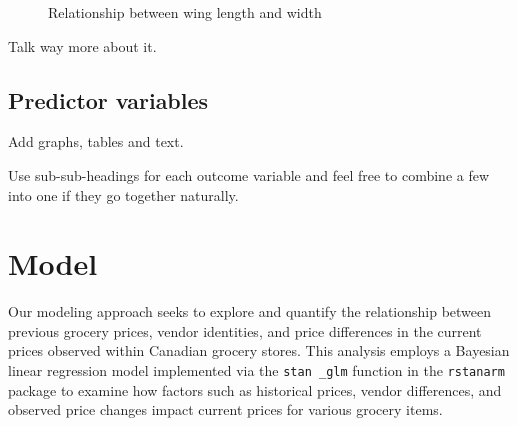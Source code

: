 \documentclass[
  letterpaper,
  DIV=11,
  numbers=noendperiod]{scrartcl}
\begin{document}
\begin{figure}


\caption{\label{fig-planes}Relationship between wing length and width}

\end{figure}%

Talk way more about it.

\subsection{Predictor variables}\label{predictor-variables}

Add graphs, tables and text.

Use sub-sub-headings for each outcome variable and feel free to combine
a few into one if they go together naturally.

\section{Model}\label{model}

Our modeling approach seeks to explore and quantify the relationship
between previous grocery prices, vendor identities, and price
differences in the current prices observed within Canadian grocery
stores. This analysis employs a Bayesian linear regression model
implemented via the \texttt{stan\ \_glm} function in the
\texttt{rstanarm} package to examine how factors such as historical
prices, vendor differences, and observed price changes impact current
prices for various grocery items.
\end{document}
